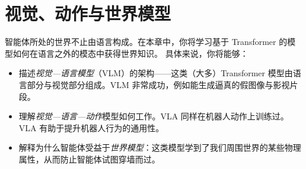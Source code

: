 
\chapter{视觉、动作与世界模型}\label{chap:world}

\begin{learningbox}
智能体所处的世界不止由语言构成。在本章中，你将学习基于 Transformer 的模型如何在语言之外的模态中获得世界知识。
具体来说，你将能够：
\begin{itemize}[leftmargin=*, nosep]
    \item 描述{\em 视觉—语言模型}（VLM）的架构——这类（大多）Transformer 模型由语言部分与视觉部分组成。VLM 非常成功，例如能生成逼真的假图像与影视片段。

    \item 理解{\em 视觉—语言—动作}模型如何工作。VLA 同样在机器人动作上训练过。VLA 有助于提升机器人行为的通用性。
    
    \item 解释为什么智能体受益于{\em 世界模型}：这类模型学到了我们周围世界的某些物理属性，从而防止智能体试图穿墙而过。%
\end{itemize}
\end{learningbox}

